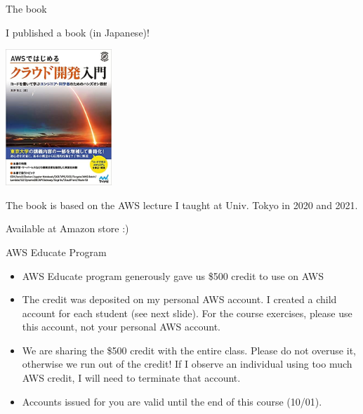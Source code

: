 \documentclass[unicode,11pt]{beamer}
\begin{document}
\begin{frame}{The book}

\centering
I published a book (in Japanese)!

\includegraphics[width=0.3\textwidth]{imgs/book_cover.jpg}

{\small The book is based on the AWS lecture I taught at Univ. Tokyo in 2020 and 2021.}

\vspace{10pt}

Available at Amazon store :)

\end{frame}

\begin{frame}{AWS Educate Program}

\begin{itemize}
    \item AWS Educate program generously gave us \$500 credit to use on AWS
    \item The credit was deposited on my personal AWS account.
    I created a child account for each student (see next slide).
    For the course exercises, please use this account, not your personal AWS account.
    \item We are sharing the \$500 credit with the entire class.
    Please do not overuse it, otherwise we run out of the credit!
    If I observe an individual using too much AWS credit, I will need to terminate that account.
    \item Accounts issued for you are valid until the end of this course (10/01).
\end{itemize}
    
\end{frame}

\end{document}
